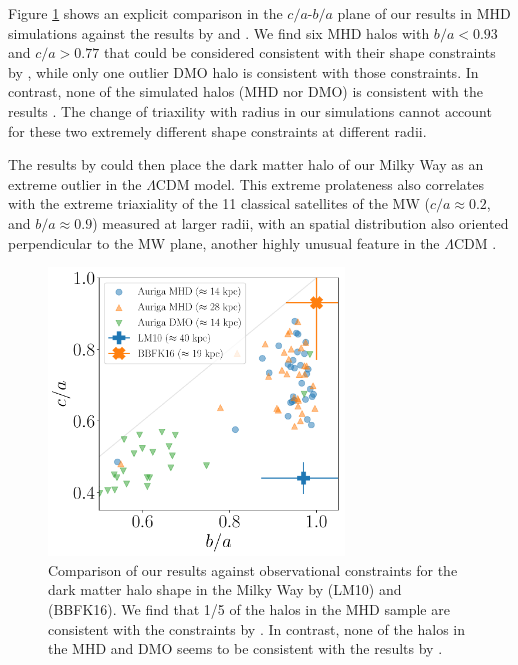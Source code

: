 \documentclass[usenatbib]{mnras}
\begin{document}
Figure \ref{fig:observations} shows an explicit comparison in
the $c/a$-$b/a$ plane of our results in MHD simulations against the
results by \cite{LM10} and \cite{Bovy16}.
We find six MHD halos with $b/a<0.93$ and $c/a>0.77$ that could be
considered consistent with their shape constraints  by \cite{Bovy16}, while
only one outlier DMO halo is consistent with those constraints.
In contrast, none of the simulated halos (MHD nor DMO) is consistent
with the results \cite{LM10}. 
The change of triaxility with radius in our simulations cannot account
for these two extremely different shape constraints at different
radii. 


The results by \label{LM10} could then place the dark matter halo of our Milky
Way as an extreme outlier in the $\Lambda$CDM model. 
This extreme prolateness also correlates with the extreme triaxiality
of the 11 classical satellites of the MW ($c/a\approx 0.2$, and
$b/a\approx0.9$) measured at larger radii, with an spatial
distribution  also oriented perpendicular to the MW plane, another
highly unusual feature in the $\Lambda$CDM \citep{2018MNRAS.478.5533F}. 


\begin{figure}
\begin{center}
\includegraphics[width=0.7\textwidth]{triaxiality_observations.pdf}
\end{center}
\caption{Comparison of our results against 
observational constraints for the 
dark matter halo shape in the Milky Way by \citet{LM10} (LM10) and
\citet{Bovy16} (BBFK16).   
We find that  1/5 of the halos in the MHD  sample are consistent with
the constraints by \citet{Bovy16}.
In contrast, none of the halos in the MHD and DMO seems to be
consistent with the results by \citet{LM10}.}
\label{fig:observations}
\end{figure}
\end{document}
